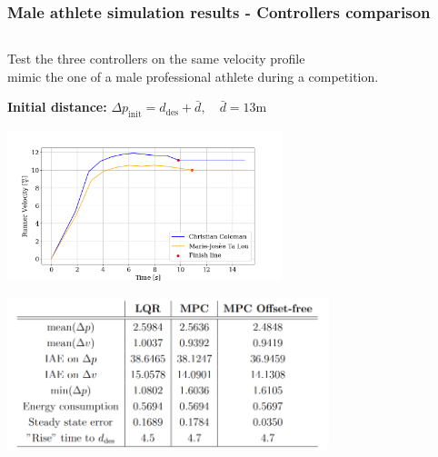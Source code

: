 \documentclass[9pt, aspectratio=169]{beamer}
\begin{document}
\begin{frame}
\frametitle{Male athlete simulation results - Controllers comparison}
\begin{columns}
\begin{column}{0.57\textwidth}
\centering
\begin{block}{}
\centering
Test the three controllers on the same velocity profile \\
mimic the one of a male professional athlete during a competition.
\end{block}
\vspace{-0.2cm}
\begin{block}{}
\textbf{Initial distance:}
\centering
$\Delta p_\text{init} = d_\text{des} + \bar{d}, \quad \bar{d}= 13$m
\end{block}
	\begin{center}
  		\includegraphics[width=0.6\textwidth]{Test_Velocities_back} 
	\end{center}
	\begin{center}
  		\includegraphics[width=0.7\textwidth]{Coleman/Table} 
	\end{center}


\end{column}
\end{columns}
\end{frame}
\end{document}
